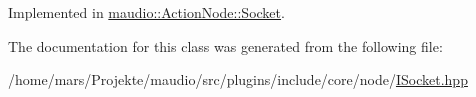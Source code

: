 Implemented in \hyperlink{classmaudio_1_1ActionNode_1_1Socket_adf54bb1504b5cf9d53fe6529e86e3653}{maudio\-::\-Action\-Node\-::\-Socket}.



The documentation for this class was generated from the following file\-:\begin{DoxyCompactItemize}
\item 
/home/mars/\-Projekte/maudio/src/plugins/include/core/node/\hyperlink{ISocket_8hpp}{I\-Socket.\-hpp}\end{DoxyCompactItemize}
